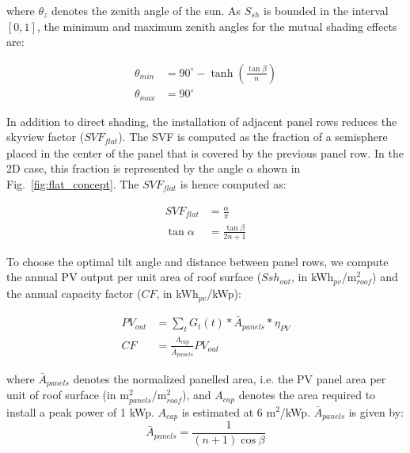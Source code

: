 where $\theta_z$ denotes the zenith angle of the sun. As $S_{sh}$ is bounded in the interval $[0,1]$, the minimum and maximum zenith angles for the mutual shading effects are:

\begin{equation}
\begin{aligned}
\label{eq:flat_theta}
    \theta_{min} & = 90^\circ - \tanh(\tfrac{\tan{\beta}}{n} ) \\
    \theta_{max} & = 90^\circ
\end{aligned}
\end{equation}

In addition to direct shading, the installation of adjacent panel rows reduces the skyview factor ($\mathit{SVF}_{\mathit{flat}}$). The SVF is computed as the fraction of a semisphere placed in the center of the panel that is covered by the previous panel row. In the 2D case, this fraction is represented by the angle $\alpha$ shown in Fig.~\ref{fig:flat_concept}. The $\mathit{SVF}_{\mathit{flat}}$ is hence computed as:

\begin{equation}
\begin{aligned}
\label{eq:flat_svf}
    \mathit{SVF}_{\mathit{flat}} & = \frac{\alpha}{\pi} \\
    \tan{\alpha} & = \frac{\tan{\beta}}{2 n + 1}
\end{aligned}
\end{equation}

To choose the optimal tilt angle and distance between panel rows, we compute the annual PV output per unit area of roof surface ($\mathit{Ssh}_{\mathit{out}}$, in kWh$_{\mathit{pv}}$/m$^2_{\mathit{roof}}$) and the annual capacity factor ($\mathit{CF}$, in kWh$_{\mathit{pv}}$/kWp):

\begin{equation}
\begin{aligned}
\label{eq:flat_pv}
    \mathit{PV}_{\mathit{out}} &= \sum_t G_t(t) * \bar{A}_{\mathit{panels}} * \eta_{PV} \\
    \mathit{CF} &= \frac{A_{\mathit{cap}}}{\bar{A}_{\mathit{panels}}} \mathit{PV}_{\mathit{out}}
\end{aligned}
\end{equation}

where $\bar{A}_{\mathit{panels}}$ denotes the normalized panelled area, i.e. the PV panel area per unit of roof surface (in m$^2_{\mathit{panels}}$/m$^2_{\mathit{roof}}$), and $A_{\mathit{cap}}$ denotes the area required to install a peak power of 1 kWp. $A_{\mathit{cap}}$ is estimated at 6 m$^2$/kWp. $\bar{A}_{\mathit{panels}}$ is given by:
\begin{equation}
\label{eq:flat_n_norm}
    \bar{A}_{\mathit{panels}} = \frac{1}{(n+1) \cos{\beta}}
\end{equation}


